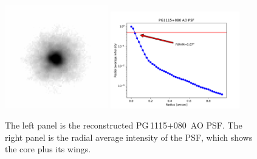 \documentclass[useAMS,usenatbib]{mnras}
\newcommand\pg{PG\,1115$+$080}
\begin{document}
\begin{figure}
  \centering
  \includegraphics[width=0.4\textwidth, clip]{PG1115_AO_PSF.png}
  \includegraphics[width=0.5\textwidth, clip]{PG1115_AO_PSF_radius.pdf}
  \caption{The left panel is the reconstructed \pg~AO PSF. The right panel is the radial average intensity of the PSF, which shows the core plus its wings.}
\label{fig:PG1115_AO_PSF}
\end{figure}

\end{document}
